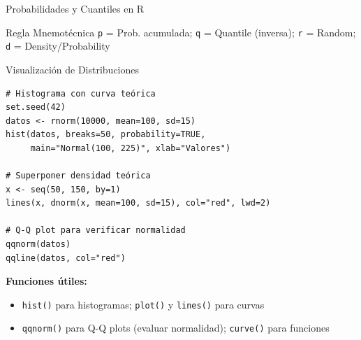 \documentclass[aspectratio=169,11pt]{beamer}
\begin{document}
\begin{frame}[fragile]{Probabilidades y Cuantiles en R}

\pause
\vspace{0.2cm}
\begin{block}{Regla Mnemotécnica}
\texttt{p} = Prob. acumulada; \texttt{q} = Quantile (inversa); \texttt{r} = Random; \texttt{d} = Density/Probability
\end{block}
\end{frame}

\begin{frame}[fragile]{Visualización de Distribuciones}
\begin{lstlisting}[basicstyle=\ttfamily\scriptsize]
# Histograma con curva teórica
set.seed(42)
datos <- rnorm(10000, mean=100, sd=15)
hist(datos, breaks=50, probability=TRUE,
     main="Normal(100, 225)", xlab="Valores")

# Superponer densidad teórica
x <- seq(50, 150, by=1)
lines(x, dnorm(x, mean=100, sd=15), col="red", lwd=2)

# Q-Q plot para verificar normalidad
qqnorm(datos)
qqline(datos, col="red")
\end{lstlisting}

\pause
\small
\textbf{Funciones útiles:}
\begin{itemize}\setlength{\itemsep}{0pt}
  \item \texttt{hist()} para histogramas; \texttt{plot()} y \texttt{lines()} para curvas
  \item \texttt{qqnorm()} para Q-Q plots (evaluar normalidad); \texttt{curve()} para funciones
\end{itemize}
\end{frame}
\end{document}
